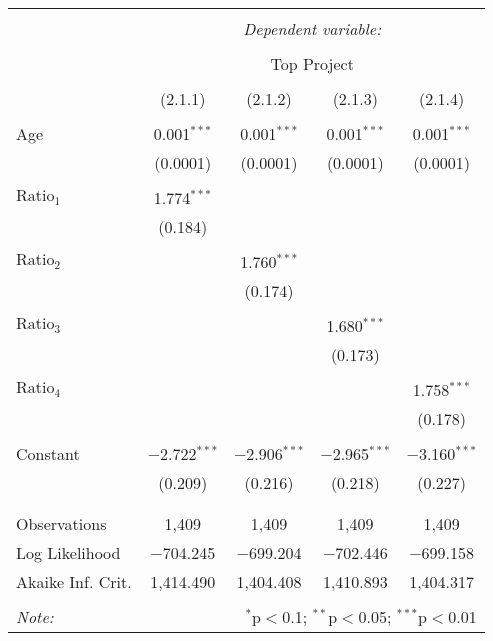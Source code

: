 
\begin{tabular}{@{\extracolsep{5pt}}lcccc}
\\[-1.8ex]\hline
\hline \\[-1.8ex]
 & \multicolumn{4}{c}{\textit{Dependent variable:}} \\
\cline{2-5}
\\[-1.8ex] & \multicolumn{4}{c}{Top Project} \\
\\[-1.8ex] & (2.1.1) & (2.1.2) & (2.1.3) & (2.1.4)\\ 
\hline \\[-1.8ex]
 Age & 0.001$^{***}$ & 0.001$^{***}$ & 0.001$^{***}$ & 0.001$^{***}$ \\
  & (0.0001) & (0.0001) & (0.0001) & (0.0001) \\
  & & & & \\
 $\text{Ratio}_{1}$ & 1.774$^{***}$ &  &  &  \\
  & (0.184) &  &  &  \\
  & & & & \\
 $\text{Ratio}_{2}$ &  & 1.760$^{***}$ &  &  \\
  &  & (0.174) &  &  \\
  & & & & \\
 $\text{Ratio}_{3}$ &  &  & 1.680$^{***}$ &  \\
  &  &  & (0.173) &  \\
  & & & & \\
 $\text{Ratio}_{4}$ &  &  &  & 1.758$^{***}$ \\
  &  &  &  & (0.178) \\
  & & & & \\
 Constant & $-$2.722$^{***}$ & $-$2.906$^{***}$ & $-$2.965$^{***}$ & $-$3.160$^{***}$ \\
  & (0.209) & (0.216) & (0.218) & (0.227) \\
  & & & & \\
\hline \\[-1.8ex]
Observations & 1,409 & 1,409 & 1,409 & 1,409 \\
Log Likelihood & $-$704.245 & $-$699.204 & $-$702.446 & $-$699.158 \\
Akaike Inf. Crit. & 1,414.490 & 1,404.408 & 1,410.893 & 1,404.317 \\
\hline
\hline \\[-1.8ex]
\textit{Note:}  & \multicolumn{4}{r}{$^{*}$p$<$0.1; $^{**}$p$<$0.05; $^{***}$p$<$0.01} \\
\end{tabular}

